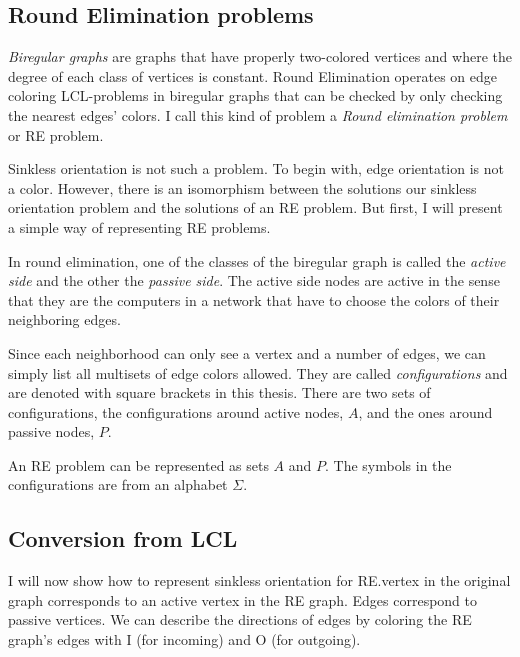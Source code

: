 \documentclass[english, 12pt, a4paper, sci, a-1b, online]{aaltothesis}
\begin{document}
\subsection{Round Elimination problems}

\emph{Biregular graphs} are graphs that have properly two-colored vertices and where the degree of each class of vertices is constant. Round Elimination operates on edge coloring LCL-problems in biregular graphs that can be checked by only checking the nearest edges' colors. I call this kind of problem a \emph{Round elimination problem} or RE problem.

Sinkless orientation is not such a problem. To begin with, edge orientation is not a color. However, there is an isomorphism between the solutions our sinkless orientation problem and the solutions of an RE problem. But first, I will present a simple way of representing RE problems.

In round elimination, one of the classes of the biregular graph is called the \emph{active side} and the other the \emph{passive side}. The active side nodes are active in the sense that they are the computers in a network that have to choose the colors of their neighboring edges.

Since each neighborhood can only see a vertex and a number of edges, we can simply list all multisets of edge colors allowed. They are called \emph{configurations} and are denoted with square brackets in this thesis. There are two sets of configurations, the configurations around active nodes, $A$, and the ones around passive nodes, $P$.

An RE problem can be represented as sets $A$ and $P$. The symbols in the configurations are from an alphabet $\Sigma$.

\subsection{Conversion from LCL}

I will now show how to represent sinkless orientation for RE.\@Each vertex in the original graph corresponds to an active vertex in the RE graph. Edges correspond to passive vertices. We can describe the directions of edges by coloring the RE graph's edges with I (for incoming) and O (for outgoing).
\end{document}
